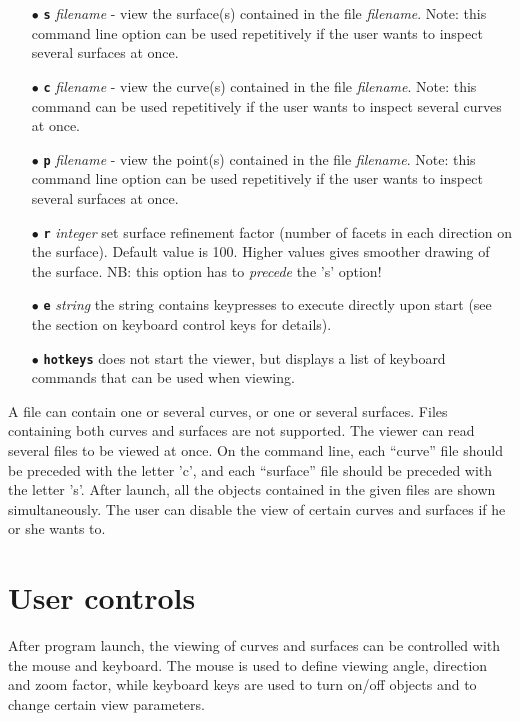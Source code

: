 \begin{itemize}
\item[$\bullet$] \textbf{\verb/s/} \textit{filename} - view the surface(s) contained in
the file \textit{filename}.  Note: this command line option can be used repetitively if
the user wants to inspect several surfaces at once.
\item[$\bullet$] \textbf{\verb/c/} \textit{filename} - view the curve(s) contained in the
file \textit{filename}.  Note: this command can be used repetitively if the user wants
to inspect several curves at once.
\item[$\bullet$] \textbf{\verb/p/} \textit{filename} - view the point(s) contained in 
the file \textit{filename}.  Note: this command line option can be used repetitively if
the user wants to inspect several surfaces at once.
\item[$\bullet$] \textbf{\verb/r/} \textit{integer} set surface refinement factor 
(number of facets in each direction on the surface). Default value is 100.  Higher values
gives smoother drawing of the surface.  NB: this option has to \emph{precede} the 's' 
option!
\item[$\bullet$] \textbf{\verb/e/} \textit{string} the string contains keypresses to execute
directly upon start (see the section on keyboard control keys for details).
\item[$\bullet$] \textbf{\verb/hotkeys/} does not start the viewer, but displays a list 
of keyboard commands that can be used when viewing.
\end{itemize}

A file can contain one or several curves, or one or several surfaces.  Files containing
both curves and surfaces are not supported.  The viewer can read several files to be
viewed at once.  On the command line, each ``curve'' file should be preceded with the
letter 'c', and each ``surface'' file should be preceded with the letter 's'.  After 
launch, all the objects contained in the given files are shown simultaneously.  The user
can disable the view of certain curves and surfaces if he or she wants to.  

\section{User controls}

After program launch, the viewing of curves and surfaces can be controlled with the mouse
and keyboard.  The mouse is used to define viewing angle, direction and zoom factor, while
keyboard keys are used to turn on/off objects and to change certain view parameters.


